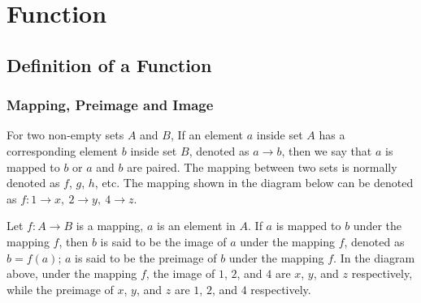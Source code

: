 \documentclass{report}
\begin{document}

\chapter{Function}

\section{Definition of a Function}

\subsection*{Mapping, Preimage and Image}

For two non-empty sets $A$ and $B$, If an element $a$ inside set $A$ has a
corresponding element $b$ inside set $B$, denoted as $a \to b$, then we say
that $a$ is mapped to $b$ or $a$ and $b$ are paired. The mapping between two
sets is normally denoted as $f$, $g$, $h$, etc. The mapping shown in the
diagram below can be denoted as $f:1 \to x,\ 2 \to y,\ 4 \to z$.

\begin{center}
\end{center}

Let $f:A \to B$ is a mapping, $a$ is an element in $A$. If $a$ is mapped to $b$
under the mapping $f$, then $b$ is said to be the image of $a$ under the
mapping $f$, denoted as $b = f(a)$; $a$ is said to be the preimage of $b$ under
the mapping $f$. In the diagram above, under the mapping $f$, the image of $1$,
$2$, and $4$ are $x$, $y$, and $z$ respectively, while the preimage of $x$,
$y$, and $z$ are $1$, $2$, and $4$ respectively.
\end{document}
